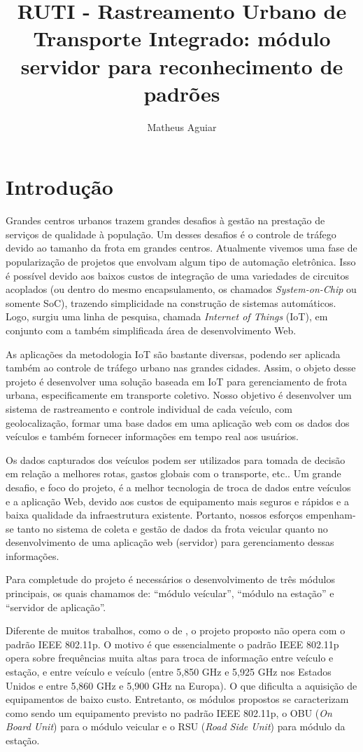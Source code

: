 \documentclass[12pt,cor2018]{uftpibic}
\title{RUTI - Rastreamento Urbano de Transporte Integrado: módulo servidor para reconhecimento de padrões}
\author{Matheus Aguiar}{Fagundes}
\begin{document}
\maketitle

\chapter{Introdução}

Grandes centros urbanos trazem grandes desafios à gestão na prestação de serviços de qualidade à população. Um desses desafios é o controle de tráfego devido ao tamanho da frota em grandes centros. Atualmente vivemos uma fase de popularização de projetos que envolvam algum tipo de automação eletrônica. Isso é possível devido aos baixos custos de integração de uma variedades de circuitos acoplados (ou dentro do mesmo encapsulamento, os chamados \textit{System-on-Chip} ou somente SoC), trazendo simplicidade na construção de sistemas automáticos. Logo, surgiu uma linha de pesquisa, chamada \textit{Internet of Things} (IoT), em conjunto com a também simplificada área de desenvolvimento Web. 

As aplicações da metodologia IoT são bastante diversas, podendo ser aplicada também ao controle de tráfego urbano nas grandes cidades. Assim, o objeto desse projeto é desenvolver uma solução baseada em IoT para gerenciamento de frota urbana, especificamente em transporte coletivo. Nosso objetivo é desenvolver um sistema de rastreamento e controle individual de cada veículo, com geolocalização, formar uma base dados em uma aplicação web com os dados dos veículos e também fornecer informações em tempo real aos usuários. 

Os dados capturados dos veículos podem ser utilizados para tomada de decisão em relação a melhores rotas, gastos globais com o transporte, etc.. Um grande desafio, e foco do projeto, é a melhor tecnologia de troca de dados entre veículos e a aplicação Web, devido aos custos de equipamento mais seguros e rápidos e a baixa qualidade da infraestrutura existente. Portanto, nossos esforços empenham-se tanto no sistema de coleta e gestão de dados da frota veicular quanto no desenvolvimento de uma aplicação web (servidor) para gerenciamento dessas informações.

Para completude do projeto é necessários o desenvolvimento de três módulos principais, os quais chamamos de: ``módulo veícular'', ``módulo na estação'' e ``servidor de aplicação''.

Diferente de muitos trabalhos, como o de , o projeto proposto não opera com o padrão IEEE 802.11p. O motivo é que essencialmente o padrão IEEE 802.11p opera sobre frequências muita altas para troca de informação entre veículo e estação, e entre veículo e veículo (entre 5,850 GHz e 5,925 GHz nos Estados Unidos e entre 5,860 GHz e 5,900 GHz na Europa). O que dificulta a aquisição de equipamentos de baixo custo. Entretanto, os módulos propostos se caracterizam como sendo um equipamento previsto no padrão IEEE 802.11p, o OBU (\textit{On Board Unit}) para o módulo veicular e o RSU (\textit{Road Side Unit}) para módulo da estação.
\end{document}
